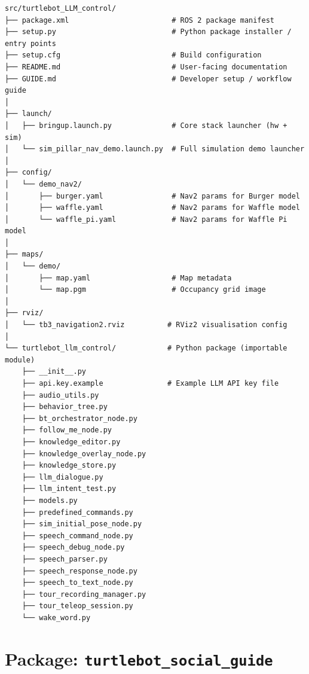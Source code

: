 \documentclass[12pt,a4paper]{report}
\begin{document}
\begin{lstlisting}[style=bashstyle, caption={\texttt{turtlebot\_LLM\_control} internal layout}]
src/turtlebot_LLM_control/
├── package.xml                        # ROS 2 package manifest
├── setup.py                           # Python package installer / entry points
├── setup.cfg                          # Build configuration
├── README.md                          # User-facing documentation
├── GUIDE.md                           # Developer setup / workflow guide
│
├── launch/
│   ├── bringup.launch.py              # Core stack launcher (hw + sim)
│   └── sim_pillar_nav_demo.launch.py  # Full simulation demo launcher
│
├── config/
│   └── demo_nav2/
│       ├── burger.yaml                # Nav2 params for Burger model
│       ├── waffle.yaml                # Nav2 params for Waffle model
│       └── waffle_pi.yaml             # Nav2 params for Waffle Pi model
│
├── maps/
│   └── demo/
│       ├── map.yaml                   # Map metadata
│       └── map.pgm                    # Occupancy grid image
│
├── rviz/
│   └── tb3_navigation2.rviz          # RViz2 visualisation config
│
└── turtlebot_llm_control/            # Python package (importable module)
    ├── __init__.py
    ├── api.key.example               # Example LLM API key file
    ├── audio_utils.py
    ├── behavior_tree.py
    ├── bt_orchestrator_node.py
    ├── follow_me_node.py
    ├── knowledge_editor.py
    ├── knowledge_overlay_node.py
    ├── knowledge_store.py
    ├── llm_dialogue.py
    ├── llm_intent_test.py
    ├── models.py
    ├── predefined_commands.py
    ├── sim_initial_pose_node.py
    ├── speech_command_node.py
    ├── speech_debug_node.py
    ├── speech_parser.py
    ├── speech_response_node.py
    ├── speech_to_text_node.py
    ├── tour_recording_manager.py
    ├── tour_teleop_session.py
    └── wake_word.py
\end{lstlisting}

\section{Package: \texttt{turtlebot\_social\_guide}}
\end{document}
